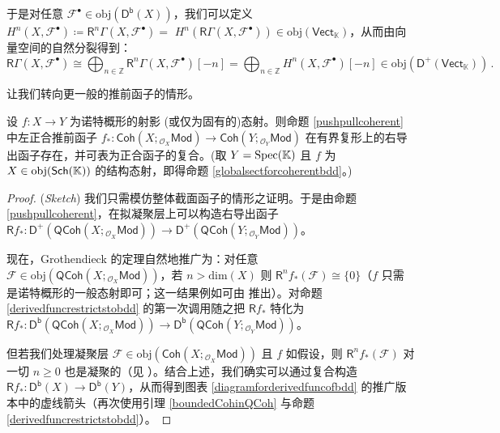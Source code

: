 于是对任意 $\mathcal{F}^\bullet\in\text{obj}(\mathsf{D^b}(X))$，我们可以定义 $H^n(X,\mathcal{F}^\bullet)\coloneqq\mathsf{R}^n\Gamma(X,\mathcal{F}^\bullet)=$ $H^n(\mathsf{R}\Gamma(X,\mathcal{F}^\bullet))\in\text{obj}(\mathsf{Vect}_\mathbb{K})$，从而由向量空间的自然分裂得到：
\[
\mathsf{R}\Gamma(X,\mathcal{F}^\bullet)\cong\bigoplus_{n\in\mathbb{Z}}\mathsf{R}^n\Gamma(X,\mathcal{F}^\bullet)[-n]=\bigoplus_{n\in\mathbb{Z}}H^n(X,\mathcal{F}^\bullet)[-n]\in\text{obj}(\mathsf{D^+}(\mathsf{Vect}_\mathbb{K}))\,.
\]

\vspace*{0.3cm}
\noindent 让我们转向更一般的推前函子的情形。

\begin{Pro}
设 $f:X\rightarrow Y$ 为诺特概形的射影 \textup(或仅为固有的\textup)态射。则命题 \ref{pushpullcoherent} 中左正合推前函子 $f_*:\mathsf{Coh}(X;{}_{\mathcal{O}_X}\!\mathsf{Mod})\rightarrow\mathsf{Coh}(Y;{}_{\mathcal{O}_Y}\!\mathsf{Mod})$ 在有界复形上的右导出函子存在，并可表为正合函子的复合。\textup(取 $Y=\textup{Spec}(\mathbb{K})$ 且 $f$ 为 $X\in\textup{obj}(\mathsf{Sch}(\mathbb{K}))$ 的结构态射，即得命题 \ref{globalsectforcoherentbdd}。\textup)
\end{Pro}

\begin{proof}(\textit{Sketch})
我们只需模仿整体截面函子的情形之证明。于是由命题 \ref{pushpullcoherent}，在拟凝聚层上可以构造右导出函子 $\mathsf{R}f_*:\mathsf{D^+}(\mathsf{QCoh}(X;{}_{\mathcal{O}_X}\!\mathsf{Mod}))\rightarrow\mathsf{D^+}(\mathsf{QCoh}(Y;{}_{\mathcal{O}_Y}\!\mathsf{Mod}))$。

现在，Grothendieck 的定理自然地推广为：对任意 $\mathcal{F}\in\text{obj}(\mathsf{QCoh}(X;{}_{\mathcal{O}_X}\!\mathsf{Mod}))$，若 $n>\text{dim}(X)$ 则 $\mathsf{R}^nf_*(\mathcal{F})\cong\{0\}$（$f$ 只需是诺特概形的一般态射即可；这一结果例如可由 \cite[Proposition III.8.1]{[Har77]} 推出）。对命题 \ref{derivedfuncrestrictstobdd} 的第一次调用随之把 $\mathsf{R}f_*$ 特化为 $\mathsf{R}f_*:\mathsf{D^b}(\mathsf{QCoh}(X;{}_{\mathcal{O}_X}\!\mathsf{Mod}))\rightarrow\mathsf{D^b}(\mathsf{QCoh}(Y;{}_{\mathcal{O}_Y}\!\mathsf{Mod}))$。

但若我们处理凝聚层 $\mathcal{F}\in\text{obj}(\mathsf{Coh}(X;{}_{\mathcal{O}_X}\!\mathsf{Mod}))$ 且 $f$ 如假设，则 $\mathsf{R}^nf_*(\mathcal{F})$ 对一切 $n\geq 0$ 也是凝聚的（见 \cite[Theorem III.8.8]{[Har77]}）。结合上述，我们确实可以通过复合构造 $\mathsf{R}f_*:\mathsf{D^b}(X)\rightarrow\mathsf{D^b}(Y)$，从而得到图表 \eqref{diagramforderivedfuncofbdd} 的推广版本中的虚线箭头（再次使用引理 \ref{boundedCohinQCoh} 与命题 \ref{derivedfuncrestrictstobdd}）。
\end{proof}

